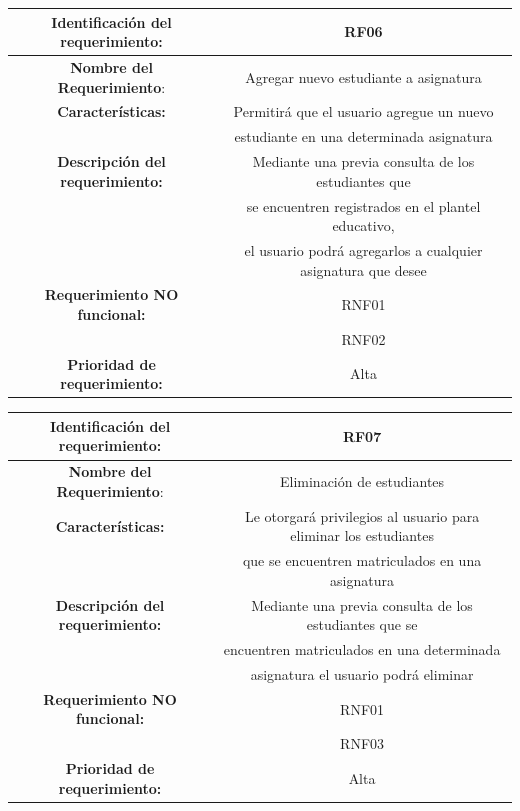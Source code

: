 \documentclass[11pt]{article}
\begin{document}
\begin{tabular}{|c|c|} 
\hline
\textbf{Identificación del requerimiento:} & RF06  \\
\hline
\textbf{Nombre del Requerimiento}: & Agregar nuevo estudiante a 
asignatura \\
\hline
\textbf{Características:} & Permitirá que el usuario agregue un 
nuevo \\ & estudiante en una determinada asignatura \\
\hline
\textbf{Descripción del requerimiento:} & Mediante una previa
consulta de los estudiantes que\\ & se encuentren registrados en el
plantel educativo, \\ &  el usuario podrá agregarlos a cualquier 
asignatura que desee \\
\hline
\textbf{Requerimiento NO funcional:} & RNF01 \\
& RNF02  \\
\hline
\textbf{Prioridad de requerimiento:} & Alta \\
\hline

\end{tabular}


\vspace{15pt}

\begin{tabular}{|c|c|} 
\hline
\textbf{Identificación del requerimiento:} & RF07  \\
\hline
\textbf{Nombre del Requerimiento}: & Eliminación de estudiantes \\
\hline
\textbf{Características:} & Le otorgará privilegios al usuario para 
eliminar los estudiantes \\ &que se encuentren matriculados en una
asignatura \\
\hline
\textbf{Descripción del requerimiento:} & Mediante una previa 
consulta de los estudiantes que se\\ & encuentren matriculados en
una determinada \\ &  asignatura el usuario podrá eliminar \\
\hline
\textbf{Requerimiento NO funcional:} & RNF01 \\
& RNF03  \\
\hline
\textbf{Prioridad de requerimiento:} & Alta \\
\hline

\end{tabular}


\vspace{15pt}
\end{document}
